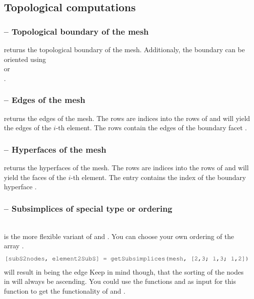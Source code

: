 \documentclass[twoside,11pt,a4paper]{article} %
\begin{document}
\subsection{Topological computations}
\subsubsection*{\texorpdfstring{ --}{} Topological boundary of the mesh}
 returns the topological boundary of the mesh. Additionaly, the boundary can be oriented using \\
 or \\
.
\subsubsection*{\texorpdfstring{ --}{} Edges of the mesh}
 returns the edges of the mesh.
The rows  are indices into the rows of  and will yield the  edges of the $i$-th element. The rows  contain the  edges of the boundary facet .
\subsubsection*{\texorpdfstring{ --}{} Hyperfaces of the mesh}
 returns the hyperfaces of the mesh.
The rows  are indices into the rows of  and will yield the  faces of the $i$-th element. The entry  contains the index of the boundary hyperface .
\subsubsection*{\texorpdfstring{ --}{} Subsimplices of special type or ordering}
 \\
 is the more flexible variant of  and . You can choose your own ordering of the array .
\begin{align*}
 \text{\mcode{[subS2nodes, element2SubS] = getSubsimplices(mesh, [2,3; 1,3; 1,2])}}
\end{align*}
will result in  being the edge 
Keep in mind though, that the sorting of the nodes in  will always be ascending.
You could use the functions  and  as input for this function to get the functionality of  and .
\end{document}
